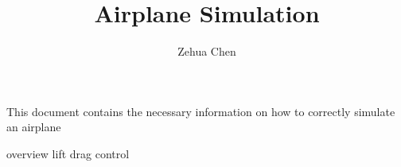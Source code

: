 \documentclass[11pt, letterpaper]{article}
\title{Airplane Simulation}
\author{Zehua Chen}
\begin{document}
  \maketitle
  \vfill
  This document contains the necessary information on how to correctly simulate
  an airplane

  \newpage
  \tableofcontents

  \newpage
  {overview}
  {lift}
  {drag}
  {control}
\end{document}

